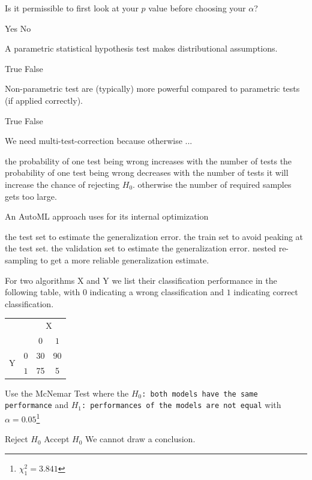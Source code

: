 \documentclass{exam}
\begin{document}
\begin{questions}
		\question Is it permissible to first look at your $p$ value before choosing your $\alpha$?
		\begin{choices}
			\choice Yes
			\choice No %
		\end{choices}
		
		\question A parametric statistical hypothesis test makes distributional assumptions.
		\begin{choices}
			\choice True  %
			\choice False
		\end{choices}
		
		\question Non-parametric test are (typically) more powerful compared to parametric tests (if applied correctly).
		\begin{choices}
			\choice True
			\choice False %
		\end{choices}
		
		\question We need multi-test-correction because otherwise ...
		\begin{choices}
			\choice the probability of one test being wrong increases with the number of tests %
			\choice the probability of one test being wrong decreases with the number of tests
			\choice it will increase the chance of rejecting $H_0$.
			\choice otherwise the number of required samples gets too large.
		\end{choices}
		
		\question An AutoML approach uses for its internal optimization
		\begin{choices}
			\choice the test set to estimate the generalization error.
			\choice the train set to avoid peaking at the test set.
			\choice the validation set to estimate the generalization error. %
			\choice nested re-sampling to get a more reliable generalization estimate. %
		\end{choices}
		
		\question For two algorithms X and Y we list their classification performance in the following table, with $0$ indicating a wrong classification and $1$ indicating correct classification.
		\begin{center}
			\begin{tabular}{cc|cc}
				& & \multicolumn{2}{c}{X} \\
				& & $0$ & $1$ \\
				\hline
				\multirow{2}{*}{Y} & $0$ & 30 & 90 \\
				& $1$ & 75 & 5 \\
			\end{tabular}
		\end{center}
		Use the McNemar Test where the \texttt{$H_0$: both models have the same performance} and \texttt{$H_1$: performances of the models are not equal}  with $\alpha = 0.05$\footnote{$\chi^2_1 = 3.841$}
		\begin{choices}
			\choice Reject $H_0$
			\choice Accept $H_0$
			\choice We cannot draw a conclusion. %
		\end{choices}
		

\end{questions}
\end{document}
